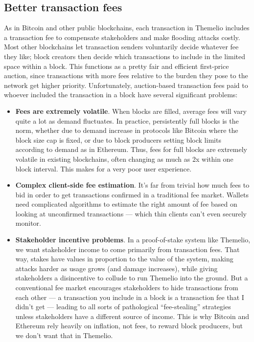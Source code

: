 \documentclass[headinclude]{scrbook}
\begin{document}
\subsection{Better transaction fees}

As in Bitcoin and other public blockchains, each transaction in Themelio includes a transaction fee to compensate stakeholders and make flooding attacks costly. Most other blockchains let transaction senders voluntarily decide whatever fee they like; block creators then decide which transactions to include in the limited space within a block. This functions as a pretty fair and efficient first-price auction, since transactions with more fees relative to the burden they pose to the network get higher priority. Unfortunately, auction-based transaction fees paid to whoever included the transaction in a block have several significant problems:

\begin{itemize}
    \item \textbf{Fees are extremely volatile}. When blocks are filled, average fees will vary quite a lot as demand fluctuates. In practice, persistently full blocks is the norm, whether due to demand increase in protocols like Bitcoin where the block size cap is fixed, or due to block producers setting block limits according to demand as in Ethereum. Thus, fees for full blocks are extremely volatile in existing blockchains, often changing as much as 2x within one block interval. This makes for a very poor user experience.
    \item \textbf{Complex client-side fee estimation}. It's far from trivial how much fees to bid in order to get transactions confirmed in a traditional fee market. Wallets need complicated algorithms to estimate the right amount of fee based on looking at unconfirmed transactions --- which thin clients can't even securely monitor.
    \item \textbf{Stakeholder incentive problems}. In a proof-of-stake system like Themelio, we want stakeholder income to come primarily from transaction fees. That way, stakes have values in proportion to the value of the system, making attacks harder as usage grows (and damage increases), while giving stakeholders a disincentive to collude to run Themelio into the ground. But a conventional fee market encourages stakeholders to hide transactions from each other --- a transaction you include in a block is a transaction fee that I didn't get --- leading to all sorts of pathological ``fee-stealing'' strategies unless stakeholders have a different source of income. This is why Bitcoin and Ethereum rely heavily on inflation, not fees, to reward block producers, but we don't want that in Themelio.
\end{itemize}
\end{document}
